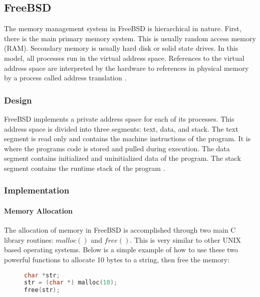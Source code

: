 \documentclass[letterpaper,draftclsnofoot,10pt,onecolumn,titlepage]{IEEEtran}\usepackage[margin=0.75in]{geometry}
\begin{document}
    \subsection{FreeBSD}
    The memory management system in FreeBSD is hierarchical in nature. First, there is the main primary memory system.
    This is usually random access memory (RAM). Secondary memory is usually hard disk or solid state drives. In 
    this model, all processes run in the virtual address space. References to the virtual address space are 
    interpreted by the hardware to references in physical memory by a process called address translation \cite{freebsd}.

        \subsubsection{Design}
        FreeBSD implements a private address space for each of its processes. This address space is divided into three 
        segments: text, data, and stack. The text segment is read only and contains the machine instructions of 
        the program. It is where the programs code is stored and pulled during execution. The data segment 
        contains initialized and uninitialized data of the program. The stack segment contains the runtime stack 
        of the program \cite{freebsd}.

        \subsubsection{Implementation}

            \paragraph{Memory Allocation}
            The allocation of memory in FreeBSD is accomplished through two main C library routines: $malloc()$ and
            $free()$. This is very similar to other UNIX based operating systems. Below is a simple example of how 
            to use these two powerful functions to allocate 10 bytes to a string, then free the memory:

\begin{figure}[H]
\begin{lstlisting}[language=C++]
char *str;
str = (char *) malloc(10);
free(str);
\end{lstlisting}
\end{figure}
\end{document}
